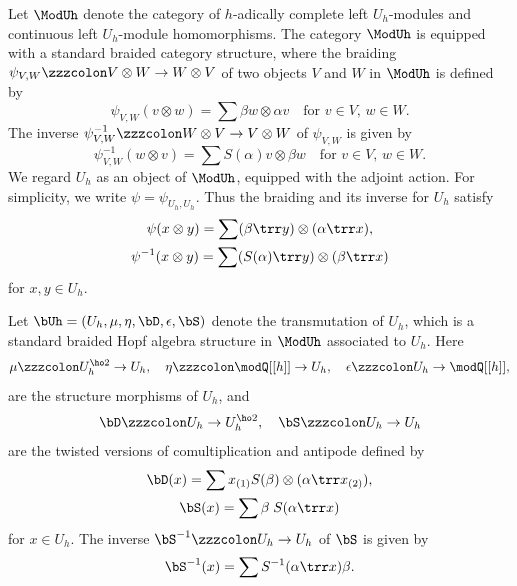 \documentclass{amsart}
\numberwithin{equation}{section}
\numberwithin{figure}{section}
\theoremstyle{plain}
\theoremstyle{definition}
\theoremstyle{remark}
\begin{document}
Let $\ModUh$ denote the category of $h$-adically complete left
$U_h$-modules and continuous left $U_h$-module homomorphisms.  The
category $\ModUh$ is equipped with a standard braided category
structure, where the braiding $\psi _{V,W}\zzzcolon V\otimes W\rightarrow W\otimes V$ of two objects
$V$ and $W$ in $\ModUh$ is defined by
\begin{equation*}
  \psi _{V,W}(v\otimes w) = \sum \beta w\otimes \alpha v\quad \text{for $v\in V$, $w\in W$}.
\end{equation*}
The inverse $\psi _{V,W}^{-1}\zzzcolon W\otimes V\rightarrow V\otimes W$ of $\psi _{V,W}$ is given by
\begin{equation*}
  \psi _{V,W}^{-1}(w\otimes v) = \sum S(\alpha ) v\otimes \beta w\quad \text{for
  $v\in V$, $w\in W$}.
\end{equation*}
We regard $U_h$ as an object of $\ModUh$, equipped
with the adjoint action.  For simplicity, we write
$\psi =\psi _{U_h,U_h}$.  Thus the braiding and its inverse for $U_h$ satisfy
\begin{gather*}
  \psi (x\otimes y) = \sum( \beta \trr y)\otimes (\alpha \trr x),\\
  \psi ^{-1}(x\otimes y) = \sum (S(\alpha )\trr y)\otimes (\beta \trr x)
\end{gather*}
for $x,y\in U_h$.

Let $\bUh=(U_h,\mu ,\eta ,\bD,\epsilon ,\bS)$ denote the transmutation
\cite{Majid:algebras,Majid:foundations} of $U_h$, which is a standard
braided Hopf algebra structure in $\ModUh$ associated to $U_h$.  Here
\begin{equation*}
  \mu \zzzcolon U_h^{\ho2}\rightarrow U_h,\quad
  \eta \zzzcolon \modQ [[h]]\rightarrow U_h,\quad
  \epsilon \zzzcolon U_h\rightarrow \modQ [[h]],
\end{equation*}
are the structure morphisms of $U_h$, and
\begin{equation*}
  \bD\zzzcolon U_h\rightarrow U_h^{\ho2}, \quad \bS\zzzcolon U_h\rightarrow U_h
\end{equation*}
are the twisted versions of comultiplication and antipode defined by
\begin{gather}
  \bD(x) = \sum x_{(1)}S(\beta )\otimes (\alpha \trr x_{(2)}),\\
  \label{eq:27}
  \bS(x) = \sum \beta \; S(\alpha \trr x)
\end{gather}
for $x\in U_h$.  The inverse $\bS^{-1}\zzzcolon U_h\rightarrow U_h$ of $\bS$ is given by
\begin{equation}
  \label{eq:28}
  \bS^{-1}(x) = \sum S^{-1}(\alpha \trr x) \beta .
\end{equation}
\end{document}
